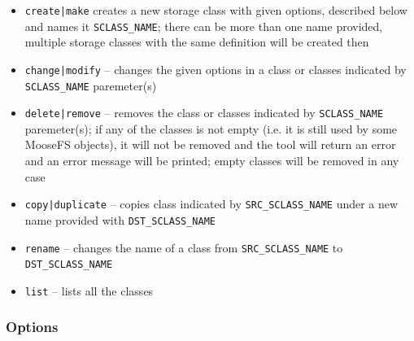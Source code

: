 \documentclass[a4paper,11pt,english]{report}
\def\code#1{\texttt{#1}}
\begin{document}
					\begin{itemize}
						\item \code{create|make} creates a new storage class with given options, described below and names it \code{SCLASS\_NAME}; there can be more than one name provided, multiple storage classes with the same definition will be created then
					
						\item \code{change|modify} -- changes the given options in a class or classes indicated by \code{SCLASS\_NAME} paremeter(s)
					
						\item \code{delete|remove} -- removes the class or classes indicated by \code{SCLASS\_NAME} paremeter(s); if any of the classes is not empty (i.e. it is still used by some MooseFS objects), it will not be removed and the tool will return an error and an error message will be printed; empty classes will be removed in any case
					
						\item \code{copy|duplicate} -- copies class indicated by \code{SRC\_SCLASS\_NAME} under a new name provided with \code{DST\_SCLASS\_NAME}
						
						\item \code{rename} -- changes the name of a class from \code{SRC\_SCLASS\_NAME} to \code{DST\_SCLASS\_NAME}
						
						\item \code{list} -- lists all the classes
					\end{itemize}
				
				\subsubsection{Options}
					
\end{document}
